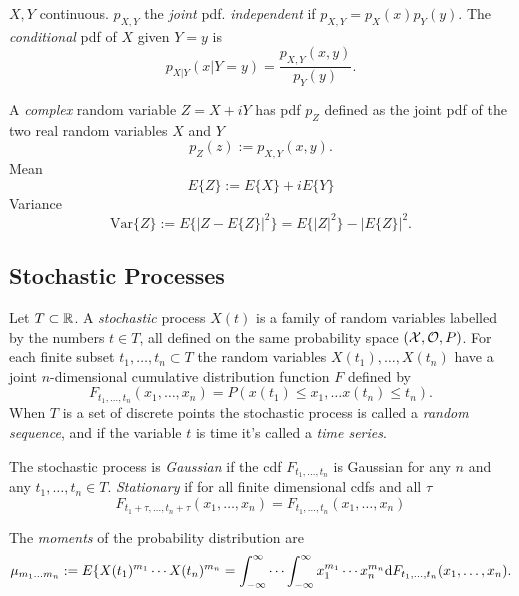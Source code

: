 $X,Y$ continuous. $p_{X,Y}$ the \textit{joint} pdf. \textit{independent} if $p_{X,Y}=p_X(x)p_Y(y)$. The \textit{conditional} pdf of $X$ given $Y=y$ is 
\begin{equation}
p_{X|Y}(x|Y=y)=\frac{p_{X,Y}(x,y)}{p_Y(y)}.
\end{equation}

A \textit{complex} random variable $Z=X+iY$ has pdf $p_Z$ defined as the joint pdf of the two real random variables $X$ and $Y$
\begin{equation}
p_Z(z):=p_{X,Y}(x,y).
\end{equation}
Mean
\begin{equation}
E\{Z\} := E\{X\}+ iE\{Y\}
\end{equation}
Variance 
\begin{equation}
\mbox{Var}\{Z\} := E\{ | Z - E\{Z\} |^2 \} = E\{|Z|^2\}-|E\{Z\}|^2.
\end{equation}

\subsection{Stochastic Processes}
Let $T\subset \mathbb{R}$. A \textit{stochastic} process $X(t)$ is a family of random variables labelled by the numbers $t\in T$, all defined on the same probability space $(\mathcal{X}, \mathcal{O}, P)$. For each finite subset ${t_1, \ldots, t_n} \subset T$ the random variables $ X(t_1), \ldots, X(t_n)$ have a joint $n$-dimensional cumulative distribution function $F$ defined by
\begin{equation}
F_{t_1, \ldots, t_n}(x_1,\ldots,x_n)=P(x(t_1)\leq x_1, \ldots x(t_n)\leq t_n).
\end{equation}
When $T$ is a set of discrete points the stochastic process is called a \textit{random sequence}, and if the variable $t$ is time it's called a \textit{time series}. 

The stochastic process is \textit{Gaussian} if the cdf $F_{t_1, \ldots, t_n}$ is Gaussian for any $n$ and any $t_1, \ldots, t_n \in T$. \textit{Stationary} if for all finite dimensional cdfs and all $\tau$
\begin{equation}
F_{t_1+\tau, \ldots, t_n+\tau}(x_1,\ldots,x_n)=F_{t_1, \ldots, t_n}(x_1,\ldots,x_n)
\end{equation}

The \textit{moments} of the probability distribution are 
\begin{equation}
\mu_{m_1 \ldots m_n} := E\{X(t_1)^{m_1}\cdots X(t_n)^{m_n} =\int_{-\infty}^{\infty}\cdots \int_{-\infty}^{\infty} x_1^{m_1}\cdots x_n^{m_n} {\mbox{d}} F_{t_1, \ldots, t_n}(x_1,\ldots,x_n).
\end{equation}



